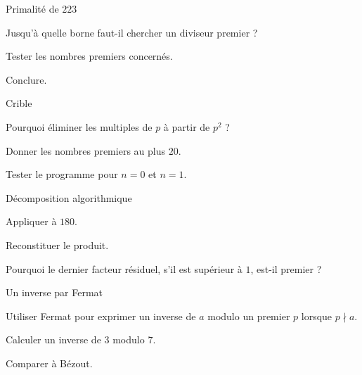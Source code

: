 \begingroup\renewcommand{\otBesoinPlace}[1]{}\begin{minipage}{\linewidth}
\begin{exercice}[2]{Primalité de $223$}

\begin{questions}
\item Jusqu’à quelle borne faut-il chercher un diviseur premier ?
\item Tester les nombres premiers concernés.
\item Conclure.
\end{questions}
\end{exercice}
\begin{exercice}[2]{Crible}

\begin{questions}
\item Pourquoi éliminer les multiples de $p$ à partir de $p^2$ ?
\item Donner les nombres premiers au plus $20$.
\item Tester le programme pour $n=0$ et $n=1$.
\end{questions}
\end{exercice}
\begin{exercice}[2]{Décomposition algorithmique}

\begin{questions}
\item Appliquer  à $180$.
\item Reconstituer le produit.
\item Pourquoi le dernier facteur résiduel, s’il est supérieur à $1$, est-il premier ?
\end{questions}
\end{exercice}
\begin{exercice}[2]{Un inverse par Fermat}

\begin{questions}
\item Utiliser Fermat pour exprimer un inverse de $a$ modulo un premier $p$ lorsque $p\nmid a$.
\item Calculer un inverse de $3$ modulo $7$.
\item Comparer à Bézout.
\end{questions}
\end{exercice}
\end{minipage}\endgroup
\clearpage
{}
